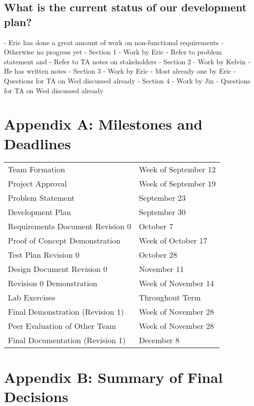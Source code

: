 \documentclass[11pt]{meetingmins}
\begin{document}
	\subsection{What is the current status of our development plan?}

	- Eric has done a great amount of work on non-functional requirements
	- Otherwise no progress yet
	- Section 1
		- Work by Eric
		- Refer to problem statement and 
		- Refer to TA notes on stakeholders
	- Section 2
		- Work by Kelvin
		- He has written notes
	- Section 3
		- Work by Eric
		- Most already one by Eric
		- Questions for TA on Wed discussed already
	- Section 4
		- Work by Jin
		- Questions for TA on Wed discussed already	

	\vspace{1em}

\newpage
\section{Appendix A: Milestones and Deadlines}
\begin{tabular}{ p{6.7cm} l}

  Team Formation & Week of September 12\\

  Project Approval & Week of September 19\\

  Problem Statement & September 23\\

  Development Plan & September 30\\

  Requirements Document Revision 0 & October 7\\

  Proof of Concept Demonstration & Week of October 17\\

  Test Plan Revision 0 & October 28\\

  Design Document Revision 0 & November 11\\

  Revision 0 Demonstration & Week of November 14\\

  Lab Exercises & Throughout Term\\

  Final Demonstration (Revision 1) & Week of November 28\\

  Peer Evaluation of Other Team & Week of November 28\\

  Final Documentation (Revision 1) & December 8\\

\end{tabular}

\newpage
\section{Appendix B: Summary of Final Decisions}
\end{document}
